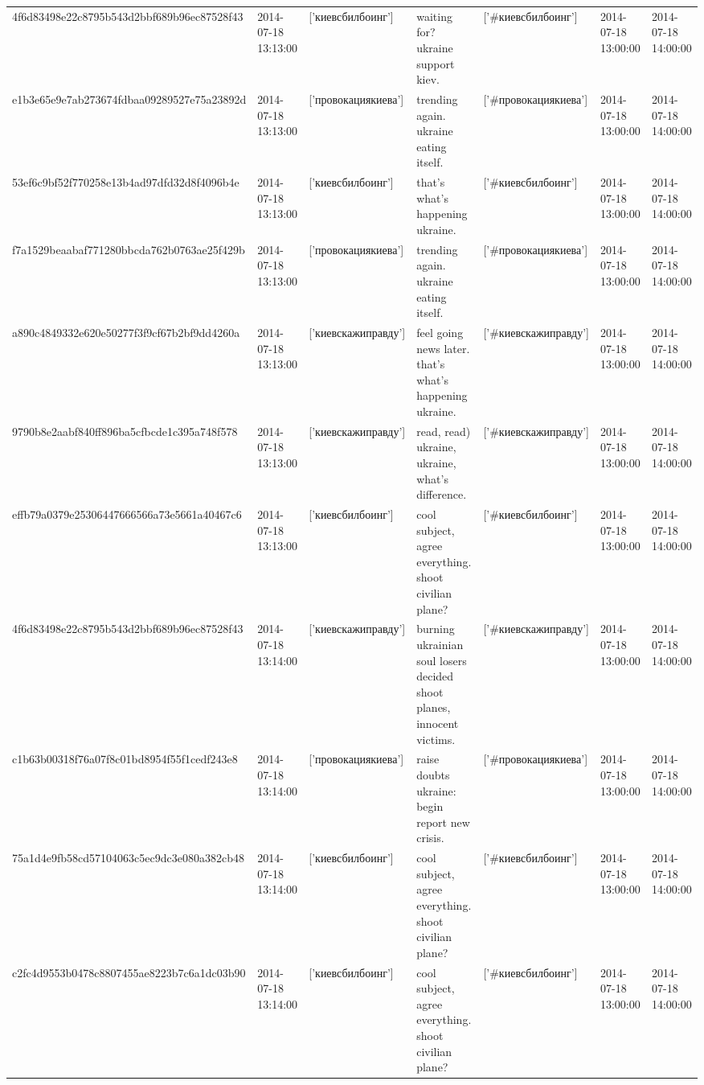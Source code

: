 \begin{tabular}{lllllll}
4f6d83498e22c8795b543d2bbf689b96ec87528f43 & 2014-07-18 13:13:00 & ['киевсбилбоинг'] & waiting for? ukraine support kiev. & ['#киевсбилбоинг'] & 2014-07-18 13:00:00 & 2014-07-18 14:00:00 \\
e1b3e65e9e7ab273674fdbaa09289527e75a23892d & 2014-07-18 13:13:00 & ['провокациякиева'] & trending again. ukraine eating itself. & ['#провокациякиева'] & 2014-07-18 13:00:00 & 2014-07-18 14:00:00 \\
53ef6c9bf52f770258e13b4ad97dfd32d8f4096b4e & 2014-07-18 13:13:00 & ['киевсбилбоинг'] & that's what's happening ukraine. & ['#киевсбилбоинг'] & 2014-07-18 13:00:00 & 2014-07-18 14:00:00 \\
f7a1529beaabaf771280bbcda762b0763ae25f429b & 2014-07-18 13:13:00 & ['провокациякиева'] & trending again. ukraine eating itself. & ['#провокациякиева'] & 2014-07-18 13:00:00 & 2014-07-18 14:00:00 \\
a890c4849332e620e50277f3f9cf67b2bf9dd4260a & 2014-07-18 13:13:00 & ['киевскажиправду'] & feel going news later. that's what's happening ukraine. & ['#киевскажиправду'] & 2014-07-18 13:00:00 & 2014-07-18 14:00:00 \\
9790b8e2aabf840ff896ba5cfbcde1c395a748f578 & 2014-07-18 13:13:00 & ['киевскажиправду'] & read, read) ukraine, ukraine, what's difference. & ['#киевскажиправду'] & 2014-07-18 13:00:00 & 2014-07-18 14:00:00 \\
effb79a0379e25306447666566a73e5661a40467c6 & 2014-07-18 13:13:00 & ['киевсбилбоинг'] & cool subject, agree everything. shoot civilian plane? & ['#киевсбилбоинг'] & 2014-07-18 13:00:00 & 2014-07-18 14:00:00 \\
4f6d83498e22c8795b543d2bbf689b96ec87528f43 & 2014-07-18 13:14:00 & ['киевскажиправду'] & burning ukrainian soul losers decided shoot planes, innocent victims. & ['#киевскажиправду'] & 2014-07-18 13:00:00 & 2014-07-18 14:00:00 \\
c1b63b00318f76a07f8c01bd8954f55f1cedf243e8 & 2014-07-18 13:14:00 & ['провокациякиева'] & raise doubts ukraine: begin report new crisis. & ['#провокациякиева'] & 2014-07-18 13:00:00 & 2014-07-18 14:00:00 \\
75a1d4e9fb58cd57104063c5ec9dc3e080a382cb48 & 2014-07-18 13:14:00 & ['киевсбилбоинг'] & cool subject, agree everything. shoot civilian plane? & ['#киевсбилбоинг'] & 2014-07-18 13:00:00 & 2014-07-18 14:00:00 \\
c2fc4d9553b0478c8807455ae8223b7c6a1dc03b90 & 2014-07-18 13:14:00 & ['киевсбилбоинг'] & cool subject, agree everything. shoot civilian plane? & ['#киевсбилбоинг'] & 2014-07-18 13:00:00 & 2014-07-18 14:00:00 \\

\end{tabular}
